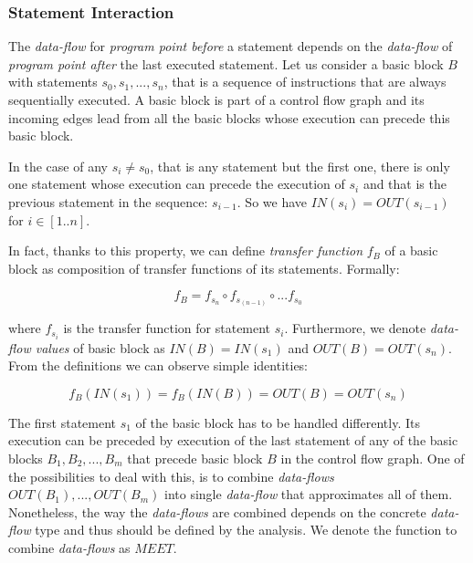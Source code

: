         \subsubsection*{Statement Interaction}
        
        The \emph{data-flow} for \emph{program point before} a statement 
        depends on the \emph{data-flow} of \emph{program point after} the 
        last executed statement. Let us consider a basic block $B$ with 
        statements $s_0, s_1, ..., s_n$, that is a sequence of 
        instructions that are always sequentially executed. A basic 
        block is part of a control flow graph and its incoming 
        edges lead from all the basic blocks whose execution can 
        precede this basic block.
        
        In the case of any $s_i \neq s_0$, that is any statement but 
        the first one, there is only one statement whose execution 
        can precede the execution of $s_i$ and that is the previous statement 
        in the sequence: $s_{i-1}$. So we have $IN(s_i) = OUT(s_{i-1})$ 
        for $i\in{[1..n]}$. 
        
        In fact, thanks to this property, we can define \emph{transfer function} 
        $f_B$ of a basic block as composition of transfer functions of 
        its statements. Formally: 
        
        \[ f_B = f_{s_n} \circ f_{s_{(n-1)}} \circ ... f_{s_0} \]
        
        where $f_{s_i}$ is the transfer function for statement $s_i$.            
        Furthermore, we denote \emph{data-flow values} of basic block as 
        $IN(B)=IN(s_1)$ and $OUT(B)=OUT(s_n)$. From the definitions we can 
        observe simple identities: 
        
        \[ f_B(IN(s_1))=f_B(IN(B))=OUT(B)=OUT(s_n) \]
        
        The first statement $s_1$ of the basic block has to be 
        handled differently. Its execution can be preceded by 
        execution of the last statement of any of 
        the basic blocks $B_1, B_2, ..., B_m$ that precede basic block 
        $B$ in the control flow graph. One of the possibilities to deal with 
        this, is to combine \emph{data-flows} $OUT(B_1), ..., OUT(B_m)$ into 
        single \emph{data-flow} that approximates all of them. 
        Nonetheless, the way the \emph{data-flows} are combined depends 
        on the concrete \emph{data-flow} type and thus 
        should be defined by the analysis. We denote the function to 
        combine \emph{data-flows} as $\mathit{MEET}$. 
        
